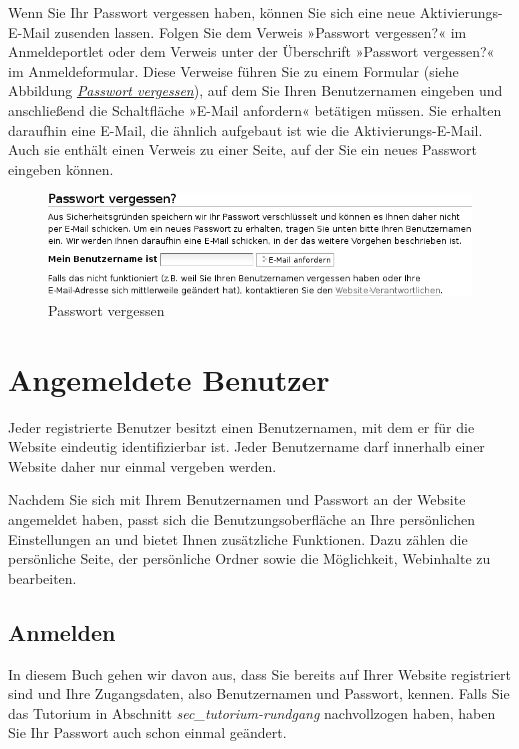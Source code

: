 \documentclass[a4paper,12pt,ngerman]{manual}
\begin{document}
Wenn Sie Ihr Passwort vergessen haben, können Sie sich eine neue
Aktivierungs-E-Mail zusenden lassen. Folgen Sie dem Verweis »Passwort
vergessen?« im Anmeldeportlet oder dem Verweis unter der Überschrift
»Passwort vergessen?« im Anmeldeformular. Diese Verweise führen Sie zu
einem Formular (siehe Abbildung
\hyperlink{fig-passwort-vergessen-formular}{\emph{Passwort vergessen}}), auf dem Sie Ihren
Benutzernamen eingeben und anschließend die Schaltfläche »E-Mail
anfordern« betätigen müssen. Sie erhalten daraufhin eine E-Mail, die
ähnlich aufgebaut ist wie die Aktivierungs-E-Mail. Auch sie enthält
einen Verweis zu einer Seite, auf der Sie ein neues Passwort eingeben
können.
\hypertarget{fig-passwort-vergessen-formular}{}\begin{figure}[htbp]
\centering

\includegraphics{passwort-vergessen-formular.png}
\caption{Passwort vergessen}\end{figure}

\resetcurrentobjects
\hypertarget{--doc-benutzer/mitglieder}{}

\section{Angemeldete Benutzer}

Jeder registrierte Benutzer besitzt einen Benutzernamen, mit dem er
für die Website eindeutig identifizierbar ist. Jeder Benutzername darf
innerhalb einer Website daher nur einmal vergeben werden.

Nachdem Sie sich mit Ihrem Benutzernamen und Passwort an der Website
angemeldet haben, passt sich die Benutzungsoberfläche an Ihre
persönlichen Einstellungen an und bietet Ihnen zusätzliche
Funktionen. Dazu zählen die persönliche Seite, der persönliche Ordner
sowie die Möglichkeit, Webinhalte zu bearbeiten.


\hypertarget{sec-anmelden}{}\subsection{Anmelden}

In diesem Buch gehen wir davon aus, dass Sie bereits auf Ihrer Website
registriert sind und Ihre Zugangsdaten, also Benutzernamen und
Passwort, kennen.  Falls Sie das Tutorium in Abschnitt
\emph{sec\_tutorium-rundgang} nachvollzogen haben, haben Sie Ihr
Passwort auch schon einmal geändert.
\end{document}
